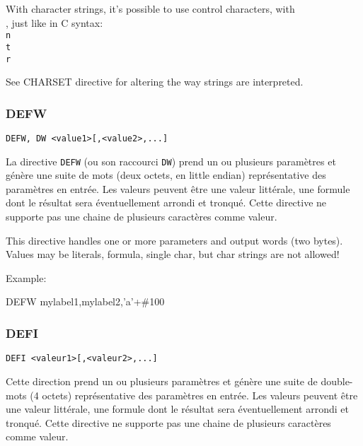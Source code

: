 \begin{xen}
With character strings, it's possible to use control characters, with \\,  just like in C syntax: \texttt{\\n\\t\\r}
\end{xen}


See CHARSET directive for altering the way strings are interpreted.

\subsubsection{DEFW}

\begin{verbatim}
DEFW, DW <value1>[,<value2>,...]
\end{verbatim}

\begin{xfr}
La directive \texttt{DEFW} (ou son raccourci \texttt{DW}) prend un ou plusieurs paramètres et génère une suite de mots (deux octets, en little endian) représentative des paramètres en entrée.
Les valeurs peuvent être une valeur littérale, une formule dont le résultat sera éventuellement arrondi et tronqué.
Cette directive ne supporte pas une chaine de plusieurs caractères comme valeur.
\end{xfr}

\begin{xen}
This directive handles one or more parameters and output words (two bytes). Values may be literals, formula, single char, but char strings are not allowed!
\end{xen}

Example:
\begin{code}
DEFW mylabel1,mylabel2,'a'+\#100
\end{code}

\subsubsection{DEFI}
\begin{xfr}
\begin{verbatim}
DEFI <valeur1>[,<valeur2>,...]
\end{verbatim}

Cette direction prend un ou plusieurs paramètres et génère une suite de double-mots (4 octets) représentative des paramètres en entrée. Les valeurs peuvent être une valeur littérale, une formule dont le résultat sera éventuellement arrondi et tronqué. Cette directive ne supporte pas une chaine de plusieurs caractères comme valeur.
\end{xfr}

